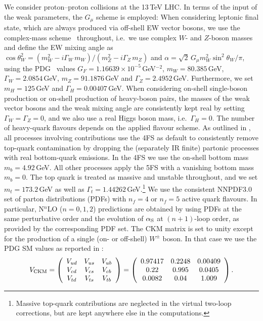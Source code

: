 \documentclass[english,11pt]{article}
\begin{document}
We consider proton--proton collisions at the 13\,TeV LHC. In terms of the input of the weak parameters, the $G_\mu$ scheme
is employed: When considering leptonic final state, which are always produced via off-shell EW vector bosons, we use the complex-mass scheme~\cite{Denner:2005fg} 
throughout, i.e.\ we use  complex $W$- and $Z$-boson masses and define the EW mixing angle as $\cos\theta_W^2=(m_W^2-i\Gamma_W\,m_W)/(m_Z^2-i\Gamma_Z\,m_Z)$
and $\alpha=\sqrt{2}\,G_\mu m_W^2\sin^2\theta_W/\pi$,
using the PDG~\cite{Olive:2016xmw} values $G_F = 1.16639\times 10^{-5}$\,GeV$^{-2}$, $m_W=80.385$\,GeV, $\Gamma_W=2.0854$\,GeV, $m_Z = 91.1876$\,GeV 
and $\Gamma_Z=2.4952$\,GeV. Furthermore, we set $m_H = 125$\,GeV and $\Gamma_H = 0.00407$\,GeV.
When considering on-shell single-boson production or on-shell production of heavy-boson pairs, the masses of the weak vector bosons and the weak mixing angle are consistently kept real by setting 
$\Gamma_W=\Gamma_Z=0$, and we also use a real Higgs boson mass, i.e.\ $\Gamma_H = 0$.
The number of heavy-quark flavours depends on the applied flavour scheme. 
As outlined in , all processes involving \ww{} contributions use the 4FS as default to consistently remove top-quark contamination by dropping 
the (separately IR finite) partonic processes with real bottom-quark emissions. In the 4FS we use the on-shell bottom mass $m_b = 4.92$\,GeV.
All other processes apply the 5FS with a vanishing bottom mass $m_b = 0$.
The top quark is treated as massive and unstable throughout, 
and we set $m_t = 173.2$\,GeV as well as $\Gamma_t = 1.44262$\,GeV.\footnote{Massive 
top-quark contributions are neglected in the virtual two-loop corrections, but are kept anywhere else in the computations.}
We use the consistent NNPDF3.0~\cite{Ball:2014uwa} set of
parton distributions (PDFs) with $n_f=4$ or $n_f=5$ active quark flavours. 
In particular, N$^n$LO ($n=0,1,2$) predictions are obtained by using PDFs at the same perturbative order and 
the evolution of $\alpha_{\mathrm{S}}$ at $(n+1)$-loop order, as provided by the corresponding PDF set.
The CKM matrix is set to unity except for the production of a single (on- or off-shell) $W^\pm$ boson. In that case we use the PDG SM values as reported in :
\begin{align}
V_{\rm CKM} =\left(\begin{array}{ccc} V_{ud} & V_{us} & V_{ub} \\  V_{cd} & V_{cs} & V_{cb} \\  V_{td} & V_{ts} & V_{tb} \end{array}\right) = \left(\begin{array}{ccc} 0.97417 & 0.2248 & 0.00409 \\  0.22 & 0.995 & 0.0405 \\  0.0082 & 0.04 & 1.009 \end{array}\right).
\end{align}
\end{document}

